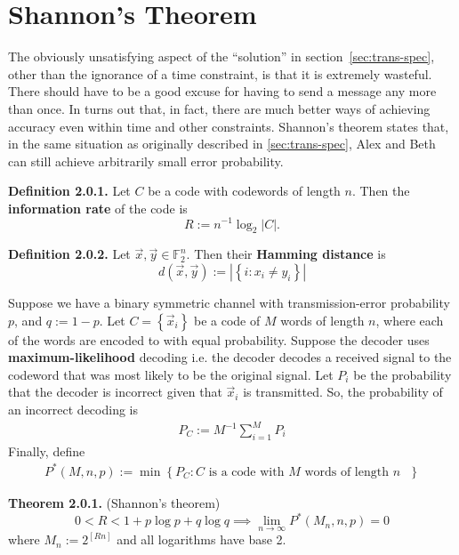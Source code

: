 \documentclass{article}
\renewcommand{\tt}[1]{\text{ #1 }}
\newcommand{\F}{\mathbb{F}}
\renewcommand{\=}{\equiv}
\renewcommand{\i}{^{-1}}
\newcommand{\ra}{\rightarrow}
\newcommand{\set}[1]{\left\{ #1 \right\}}
\renewcommand{\v}{\vec}
\newcommand{\x}{{\v x}}
\newcommand{\y}{{\v y}}
\newcommand{\definition}[1]{\vspace{1em}\noindent\textbf{Definition #1.} }
\newcommand{\theorem}[1]{\vspace{1em}\noindent\textbf{Theorem #1.} }
\begin{document}
\section{Shannon's Theorem}

The obviously unsatisfying aspect of the ``solution'' in section~\ref{sec:trans-spec}, other than the ignorance of a time constraint, is that it is extremely wasteful. There should have to be a good excuse for having to send a message any more than once.
In turns out that, in fact, there are much better ways of achieving accuracy even within time and other constraints.
Shannon's theorem states that, in the same situation as originally described in \ref{sec:trans-spec}, Alex and Beth can still achieve arbitrarily small error probability.

\definition{2.0.1} \label{eq:defR}
Let $C$ be a code with codewords of length $n$. Then the \textbf{information rate} of the code is
$$ R := n\i \log_2 |C|. $$

\definition{2.0.2}
Let $\x, \y \in \F_2^n$. Then their \textbf{Hamming distance} is
$$ d(\x, \y) := |\set{ i : x_i \neq y_i }| $$

Suppose we have a binary symmetric channel with transmission-error probability $p$, and $q := 1 - p$.
Let $C = \set{ \x_i }$ be a code of $M$ words of length $n$, where each of the words are encoded to with equal probability.
Suppose the decoder uses \textbf{maximum-likelihood} decoding i.e. the decoder decodes a received signal to the codeword that was most likely to be the original signal.
Let $P_i$ be the probability that the decoder is incorrect given that $\x_i$ is transmitted.
So, the probability of an incorrect decoding is
\begin{align}
  P_C := M\i \sum_{i=1}^M P_i
\end{align}
Finally, define
\begin{align}
  P^*(M, n, p) := \min\set{ P_C : C \tt{is a code with $M$ words of length $n$} }
\end{align}

\theorem{2.0.1}
(Shannon's theorem)
$$
0 < R < 1 + p \log p + q \log q
\implies \lim_{n \ra \infty} P^*(M_n, n, p) = 0
$$
where $M_n := 2^{[Rn]}$ and all logarithms have base 2.
\end{document}
